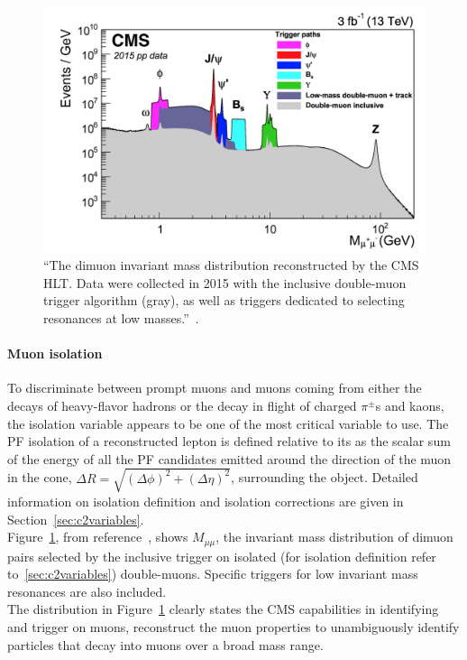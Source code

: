  \begin{figure}[h!]
\centering
\includegraphics[clip,trim=1.2cm 0.1cm 0.5cm 0.3cm, width=.60\textwidth]{Figures/c2/dimuon}
\caption{``The dimuon invariant mass distribution reconstructed by the CMS HLT. Data were
collected in 2015 with the inclusive double-muon trigger algorithm (gray), as well as triggers
dedicated to selecting resonances at low masses.''~\cite{Sirunyan_2018_muon}.}
\label{fig:dimuon}
\end{figure}

\paragraph{Muon isolation}\label{sec:muoniso}
To discriminate between prompt muons and muons coming from either the decays
of heavy-flavor hadrons or the decay in flight of charged $\pi^{\pm}$s and kaons, the isolation variable appears to be one of
the most critical variable to use. The PF isolation of a reconstructed
lepton is defined relative to its \pt as the scalar
sum of the energy of all the PF candidates emitted around the
direction of the muon in the cone, $\Delta R = \sqrt{(\Delta
  \phi)^2+(\Delta \eta)^2}$, surrounding the object. Detailed
information on isolation definition and isolation corrections are
given in Section~\ref{sec:c2variables}.\\


Figure~\ref{fig:dimuon}, from reference~\cite{Sirunyan_2018_muon}, shows $M_{\mu \mu}$, the invariant mass distribution of dimuon pairs selected by
the inclusive trigger on isolated (for isolation definition refer
to~\ref{sec:c2variables}) double-muons. Specific triggers for low
invariant mass resonances are also included.\\
The distribution in Figure~\ref{fig:dimuon} clearly states
the CMS capabilities in identifying and trigger on
muons, reconstruct the muon properties to unambiguously
identify particles that decay into muons over a broad mass range.



